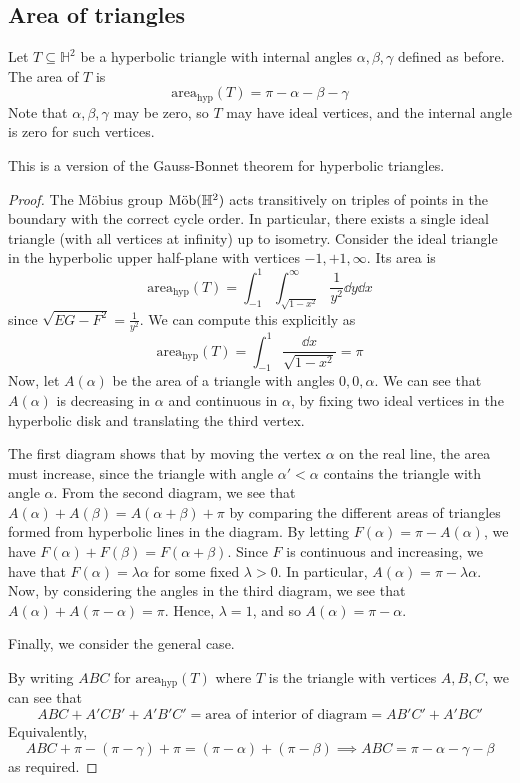 \subsection{Area of triangles}
\begin{theorem}
	Let \( T \subseteq \mathbb H^2 \) be a hyperbolic triangle with internal angles \( \alpha, \beta, \gamma \) defined as before.
	The area of \( T \) is
	\[ \mathrm{area}_{\text{hyp}}(T) = \pi - \alpha - \beta - \gamma \]
	Note that \( \alpha, \beta, \gamma \) may be zero, so \( T \) may have ideal vertices, and the internal angle is zero for such vertices.
\end{theorem}
This is a version of the Gauss-Bonnet theorem for hyperbolic triangles.
\begin{proof}
	The M\"obius group \( \text{M\"ob}(\mathbb H^2) \) acts transitively on triples of points in the boundary with the correct cycle order.
	In particular, there exists a single ideal triangle (with all vertices at infinity) up to isometry.
	Consider the ideal triangle in the hyperbolic upper half-plane with vertices \( -1, +1, \infty \).
	Its area is
	\[ \mathrm{area}_{\text{hyp}}(T) = \int_{-1}^1 \int_{\sqrt{1-x^2}}^\infty \frac{1}{y^2} \dd{y} \dd{x} \]
	since \( \sqrt{EG - F^2} = \frac{1}{y^2} \).
	We can compute this explicitly as
	\[ \mathrm{area}_{\text{hyp}}(T) = \int_{-1}^1 \frac{\dd{x}}{\sqrt{1-x^2}} = \pi \]
	Now, let \( A(\alpha) \) be the area of a triangle with angles \( 0, 0, \alpha \).
	We can see that \( A(\alpha) \) is decreasing in \( \alpha \) and continuous in \( \alpha \), by fixing two ideal vertices in the hyperbolic disk and translating the third vertex.
	\begin{center}
		\quad
		\quad
	\end{center}
	The first diagram shows that by moving the vertex \( \alpha \) on the real line, the area must increase, since the triangle with angle \( \alpha' < \alpha \) contains the triangle with angle \( \alpha \).
	From the second diagram, we see that \( A(\alpha) + A(\beta) = A(\alpha + \beta) + \pi \) by comparing the different areas of triangles formed from hyperbolic lines in the diagram.
	By letting \( F(\alpha) = \pi - A(\alpha) \), we have \( F(\alpha) + F(\beta) = F(\alpha + \beta) \).
	Since \( F \) is continuous and increasing, we have that \( F(\alpha) = \lambda \alpha \) for some fixed \( \lambda > 0 \).
	In particular, \( A(\alpha) = \pi - \lambda \alpha \).
	Now, by considering the angles in the third diagram, we see that \( A(\alpha) + A(\pi - \alpha) = \pi \).
	Hence, \( \lambda = 1 \), and so \( A(\alpha) = \pi - \alpha \).

	Finally, we consider the general case.
	\begin{center}
	\end{center}
	By writing \( ABC \) for \( \mathrm{area}_{\text{hyp}}(T) \) where \( T \) is the triangle with vertices \( A, B, C \), we can see that
	\[ ABC + A'CB' + A'B'C' =  \text{area of interior of diagram} = AB'C' + A'BC' \]
	Equivalently,
	\[ ABC + \pi - (\pi - \gamma) + \pi = (\pi - \alpha) + (\pi - \beta) \implies ABC = \pi - \alpha - \gamma - \beta \]
	as required.
\end{proof}

